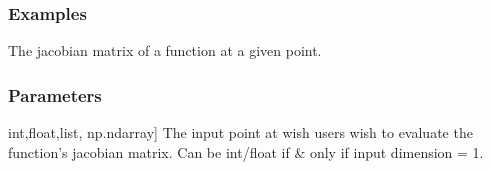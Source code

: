 \documentclass[letterpaper,10pt,english]{sphinxmanual}
\begin{document}
\begin{fulllineitems}
\begin{fulllineitems}
\subsubsection{Examples}
\label{\detokenize{autodiff:id3}}
\begin{sphinxVerbatim}[commandchars=\\\{\}]
 
  
  \PYG{p}{[}\PYG{p}{]}
\end{sphinxVerbatim}

\end{fulllineitems}


\begin{fulllineitems}
\label{\detokenize{autodiff:autodiff.func.Func.jacobian}}
\pysigstartsignatures
{}
\pysigstopsignatures
\sphinxAtStartPar
The jacobian matrix of a function at a given point.


\subsubsection{Parameters}
\label{\detokenize{autodiff:id4}}\begin{description}
\sphinxlineitem{point}{[}int,float,list, np.ndarray{]}
\sphinxAtStartPar
The input point at wish users wish to evaluate the function’s jacobian matrix. Can be int/float if \& only if input dimension = 1.


\end{description}
\end{fulllineitems}
\end{fulllineitems}
\end{document}
